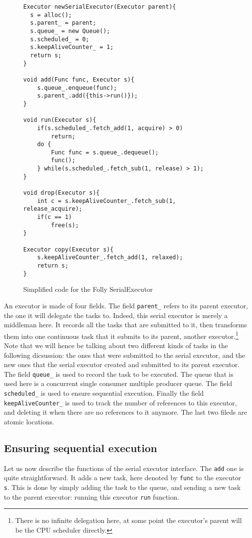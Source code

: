 \begin{figure}
	\begin{lstlisting}
Executor newSerialExecutor(Executor parent){
  s = alloc();
  s.parent_ = parent;
  s.queue_ = new Queue();
  s.scheduled_ = 0;
  s.keepAliveCounter_ = 1;
  return s;
}

void add(Func func, Executor s){
	s.queue_.enqueue(func);
	s.parent_.add({this->run()});
}

void run(Executor s){
	if(s.scheduled_.fetch_add(1, acquire) > 0)
		return;
	do {
		Func func = s.queue_.dequeue();
		func();
	} while(s.scheduled_.fetch_sub(1, release) > 1);
}

void drop(Executor s){
	int c = s.keepAliveCounter_.fetch_sub(1, release_acquire);
	if(c == 1)
		free(s);
}

Executor copy(Executor s){
	s.keepAliveCounter_.fetch_add(1, relaxed);
	return s;
}
	\end{lstlisting}

		\caption{Simplified code for the Folly SerialExecutor}
\label{fig:simplSerialExec}
\end{figure}


An executor is made of four fields. The field \texttt{parent\_} refers to its parent executor, the one it will delegate the tasks to. Indeed, this serial executor is merely a middleman here. It records all the tasks that are submitted to it, then transforms them into one continuous task that it submits to its parent, another executor.\footnote{There is no infinite delegation here, at some point the executor's parent will be the CPU scheduler directly.} Note that we will hence be talking about two different kinds of tasks in the following dicsussion: the ones that were submitted to the serial executor, and the new ones that the serial executor created and submitted to its parent executor. The field \texttt{queue\_} is used to record the task to be executed. The queue that is used here is a concurrent single consumer multiple producer queue. The field \texttt{scheduled\_} is used to ensure sequential execution. Finally the field \texttt{keepAliveCounter\_} is used to track the number of references to this executor, and deleting it when there are no references to it anymore. The last two fileds are atomic locations.

\subsection{Ensuring sequential execution}
Let us now describe the functions of the serial executor interface. The \texttt{add} one is quite straightforward. It adds a new task, here denoted by \texttt{func} to the executor \texttt{s}. This is done by simply adding the task to the queue, and sending a new task to the parent executor: running this executor \texttt{run} function. 

